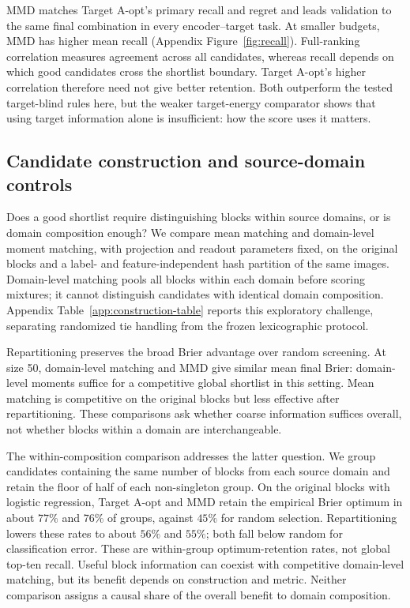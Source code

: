MMD matches Target A-opt's primary recall and regret and leads validation to the same final combination in every encoder--target task. At smaller budgets, MMD has higher mean recall (Appendix Figure~\ref{fig:recall}). Full-ranking correlation measures agreement across all candidates, whereas recall depends on which good candidates cross the shortlist boundary. Target A-opt's higher correlation therefore need not give better retention. Both outperform the tested target-blind rules here, but the weaker target-energy comparator shows that using target information alone is insufficient: how the score uses it matters.

\subsection{Candidate construction and source-domain controls}
\label{sec:construction}
Does a good shortlist require distinguishing blocks within source domains, or is domain composition enough? We compare mean matching and domain-level moment matching, with projection and readout parameters fixed, on the original blocks and a label- and feature-independent hash partition of the same images. Domain-level matching pools all blocks within each domain before scoring mixtures; it cannot distinguish candidates with identical domain composition. Appendix Table~\ref{app:construction-table} reports this exploratory challenge, separating randomized tie handling from the frozen lexicographic protocol.

Repartitioning preserves the broad Brier advantage over random screening. At size 50, domain-level matching and MMD give similar mean final Brier: domain-level moments suffice for a competitive global shortlist in this setting. Mean matching is competitive on the original blocks but less effective after repartitioning. These comparisons ask whether coarse information suffices overall, not whether blocks within a domain are interchangeable.

The within-composition comparison addresses the latter question. We group candidates containing the same number of blocks from each source domain and retain the floor of half of each non-singleton group. On the original blocks with logistic regression, Target A-opt and MMD retain the empirical Brier optimum in about $77\%$ and $76\%$ of groups, against $45\%$ for random selection. Repartitioning lowers these rates to about $56\%$ and $55\%$; both fall below random for classification error. These are within-group optimum-retention rates, not global top-ten recall. Useful block information can coexist with competitive domain-level matching, but its benefit depends on construction and metric. Neither comparison assigns a causal share of the overall benefit to domain composition.

